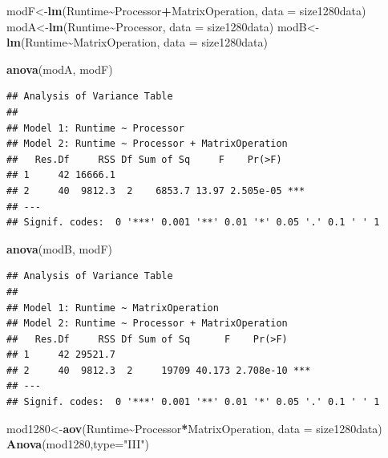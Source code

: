 \documentclass[
]{article}
\newenvironment{Shaded}{\begin{snugshade}}{\end{snugshade}}
\newcommand{\DataTypeTok}[1]{\textcolor[rgb]{0.13,0.29,0.53}{#1}}
\newcommand{\KeywordTok}[1]{\textcolor[rgb]{0.13,0.29,0.53}{\textbf{#1}}}
\newcommand{\NormalTok}[1]{#1}
\newcommand{\OperatorTok}[1]{\textcolor[rgb]{0.81,0.36,0.00}{\textbf{#1}}}
\newcommand{\StringTok}[1]{\textcolor[rgb]{0.31,0.60,0.02}{#1}}
\begin{document}
\begin{Shaded}
\begin{Highlighting}[]
\NormalTok{modF\textless{}{-}}\KeywordTok{lm}\NormalTok{(Runtime}\OperatorTok{\textasciitilde{}}\NormalTok{Processor}\OperatorTok{+}\NormalTok{MatrixOperation, }\DataTypeTok{data =}\NormalTok{ size1280data)}
\NormalTok{modA\textless{}{-}}\KeywordTok{lm}\NormalTok{(Runtime}\OperatorTok{\textasciitilde{}}\NormalTok{Processor, }\DataTypeTok{data =}\NormalTok{ size1280data)}
\NormalTok{modB\textless{}{-}}\KeywordTok{lm}\NormalTok{(Runtime}\OperatorTok{\textasciitilde{}}\NormalTok{MatrixOperation, }\DataTypeTok{data =}\NormalTok{ size1280data)}

\KeywordTok{anova}\NormalTok{(modA, modF)}
\end{Highlighting}
\end{Shaded}

\begin{verbatim}
## Analysis of Variance Table
## 
## Model 1: Runtime ~ Processor
## Model 2: Runtime ~ Processor + MatrixOperation
##   Res.Df     RSS Df Sum of Sq     F    Pr(>F)    
## 1     42 16666.1                                 
## 2     40  9812.3  2    6853.7 13.97 2.505e-05 ***
## ---
## Signif. codes:  0 '***' 0.001 '**' 0.01 '*' 0.05 '.' 0.1 ' ' 1
\end{verbatim}

\begin{Shaded}
\begin{Highlighting}[]
\KeywordTok{anova}\NormalTok{(modB, modF)}
\end{Highlighting}
\end{Shaded}

\begin{verbatim}
## Analysis of Variance Table
## 
## Model 1: Runtime ~ MatrixOperation
## Model 2: Runtime ~ Processor + MatrixOperation
##   Res.Df     RSS Df Sum of Sq      F    Pr(>F)    
## 1     42 29521.7                                  
## 2     40  9812.3  2     19709 40.173 2.708e-10 ***
## ---
## Signif. codes:  0 '***' 0.001 '**' 0.01 '*' 0.05 '.' 0.1 ' ' 1
\end{verbatim}

\begin{Shaded}
\begin{Highlighting}[]
\NormalTok{mod1280\textless{}{-}}\KeywordTok{aov}\NormalTok{(Runtime}\OperatorTok{\textasciitilde{}}\NormalTok{Processor}\OperatorTok{*}\NormalTok{MatrixOperation, }\DataTypeTok{data =}\NormalTok{ size1280data)}
\KeywordTok{Anova}\NormalTok{(mod1280,}\DataTypeTok{type=}\StringTok{"III"}\NormalTok{)}
\end{Highlighting}
\end{Shaded}
\end{document}
